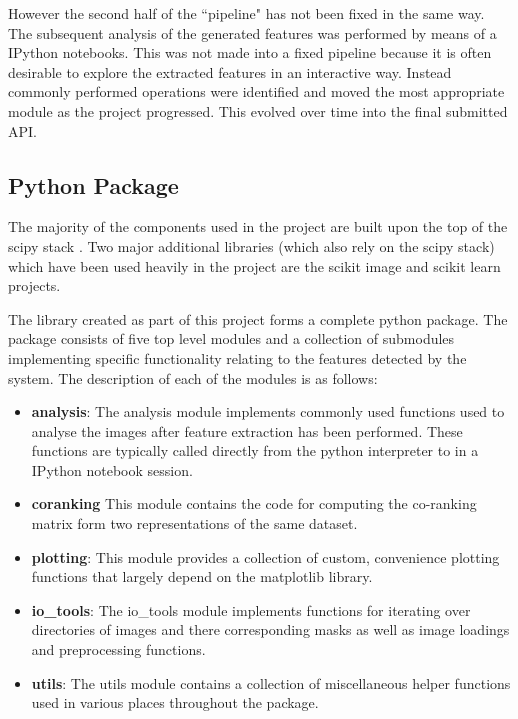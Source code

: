 However the second half of the ``pipeline" has not been fixed in the same way. The subsequent analysis of the generated features was performed by means of a IPython notebooks. This was not made into a fixed pipeline because it is often desirable to explore the extracted features in an interactive way. Instead commonly performed operations were identified and moved the most appropriate module as the project progressed. This evolved over time into the final submitted API. 

\subsection{Python Package}
The majority of the components used in the project are built upon the top of the scipy stack \cite{jones2014scipy}. Two major additional libraries (which also rely on the scipy stack) which have been used heavily in the project are the scikit image \cite{van2014scikit} and scikit learn \cite{pedregosa2011scikit} projects.

The library created as part of this project forms a complete python package. The package consists of five top level modules and a collection of submodules implementing specific functionality relating to the features detected by the system. The description of each of the modules is as follows:

\begin{itemize}
	\item {\bf analysis}: The analysis module implements commonly used functions used to analyse the images after feature extraction has been performed. These functions are typically called directly from the python interpreter to in a IPython notebook session.
	\item {\bf coranking} This module contains the code for computing the co-ranking matrix form two representations of the same dataset.
	\item {\bf plotting}: This module provides a collection of custom, convenience plotting functions that largely depend on the matplotlib library.
	\item {\bf io\_tools}: The io\_tools module implements functions for iterating over directories of images and there corresponding masks as well as image loadings and preprocessing functions.
	\item {\bf utils}: The utils module contains a collection of miscellaneous helper functions used in various places throughout the package.
\end{itemize}

